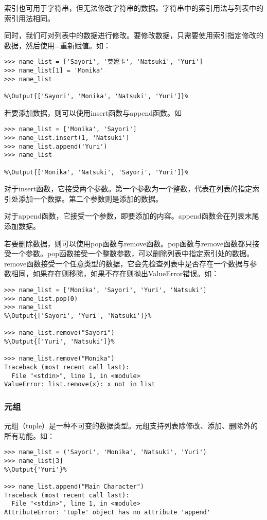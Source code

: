 \documentclass[../../Main.tex]{subfiles}
\begin{document}
\begin{ExtraKnowledge}
    索引也可用于字符串，但无法修改字符串的数据。字符串中的索引用法与列表中的索引用法相同。
\end{ExtraKnowledge}

同时，我们可对列表中的数据进行修改。要修改数据，只需要使用索引指定修改的数据，然后使用=重新赋值。如：
\begin{lstlisting}
>>> name_list = ['Sayori', '莫妮卡', 'Natsuki', 'Yuri']
>>> name_list[1] = 'Monika'
>>> name_list

%\Output{['Sayori', 'Monika', 'Natsuki', 'Yuri']}%
\end{lstlisting}

若要添加数据，则可以使用insert函数与append函数。如
\begin{lstlisting}
>>> name_list = ['Monika', 'Sayori']
>>> name_list.insert(1, 'Natsuki')
>>> name_list.append('Yuri')
>>> name_list

%\Output{['Monika', 'Natsuki', 'Sayori', 'Yuri']}%
\end{lstlisting}

对于insert函数，它接受两个参数。第一个参数为一个整数，代表在列表的指定索引处添加一个数据。第二个参数则是添加的数据。

对于append函数，它接受一个参数，即要添加的内容。append函数会在列表末尾添加数据。

若要删除数据，则可以使用pop函数与remove函数。pop函数与remove函数都只接受一个参数。pop函数接受一个整数参数，可以删除列表中指定索引处的数据。remove函数接受一个任意类型的数据，它会先检查列表中是否存在一个数据与参数相同，如果存在则移除，如果不存在则抛出ValueError错误。如：
\begin{lstlisting}
>>> name_list = ['Monika', 'Sayori', 'Yuri', 'Natsuki']
>>> name_list.pop(0)
>>> name_list
%\Output{['Sayori', 'Yuri', 'Natsuki']}%

>>> name_list.remove("Sayori")
%\Output{['Yuri', 'Natsuki']}%

>>> name_list.remove("Monika")
Traceback (most recent call last):
  File "<stdin>", line 1, in <module>
ValueError: list.remove(x): x not in list
\end{lstlisting}

\subsubsection{元组}
元组（tuple）是一种不可变的数据类型。元组支持列表除修改、添加、删除外的所有功能。如：
\begin{lstlisting}
>>> name_list = ('Sayori', 'Monika', 'Natsuki', 'Yuri')
>>> name_list[3]
%\Output{'Yuri'}%

>>> name_list.append("Main Character")
Traceback (most recent call last):
  File "<stdin>", line 1, in <module>
AttributeError: 'tuple' object has no attribute 'append'
\end{lstlisting}
\end{document}
